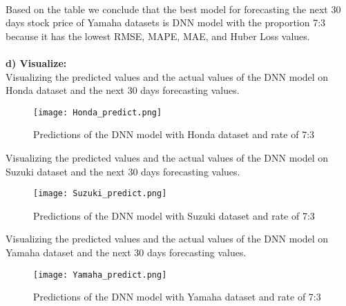 \documentclass{ieeeojies}
\begin{document}
\\
Based on the table we conclude that the best model for forecasting the next 30 days stock price of Yamaha datasets is DNN model with the proportion 7:3 because it has the lowest RMSE, MAPE, MAE, and Huber Loss values.\\
\\
\textbf{d) Visualize:}\\
Visualizing the predicted values and the actual values of the DNN model on Honda dataset and the next 30 days forecasting values.
\begin{figure} [H]
    \centering
    \texttt{[image: Honda\_predict.png]}
    \caption{Predictions of the DNN model with Honda dataset and rate of 7:3}
    \label{fig:enter-label}
\end{figure}
Visualizing the predicted values and the actual values of the DNN model on Suzuki dataset and the next 30 days forecasting values.
\begin{figure} [H]
    \centering
    \texttt{[image: Suzuki\_predict.png]}
    \caption{Predictions of the DNN model with Suzuki dataset and rate of 7:3}
    \label{fig:enter-label}
\end{figure}
Visualizing the predicted values and the actual values of the DNN model on Yamaha dataset and the next 30 days forecasting values.
\begin{figure} [H]
    \centering
    \texttt{[image: Yamaha\_predict.png]}
    \caption{Predictions of the DNN model with Yamaha dataset and rate of 7:3}
    \label{fig:enter-label}
\end{figure}
\end{document}

